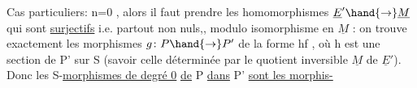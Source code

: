 Cas particuliers:  n=0 , alors  il faut prendre  les  homomorphismes
$\underline{E}' \hand{\to} \underline{M}$  qui sont \uline{surjectifs} i.e. partout non nuls,, modulo isomorphisme en $\underline{M}$ : on trouve
exactement les  morphismes  $g\colon P \hand{\to} P'$  de la forme  hf , où  h est une
section de  P' sur S  (savoir celle déterminée par  le quotient inversible
$\underline{M}$ de $\underline{E}'$). Donc les S-\uline{morphismes de  degré 0}  \uline{de} P \uline{dans} P' \uline{sont les morphis-}\placedmargin{\ensuremath{\backslash}}%


